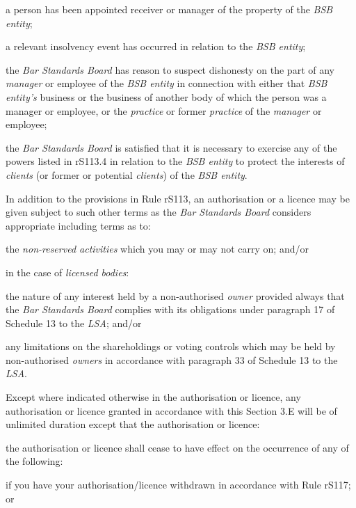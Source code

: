\item a person has been appointed receiver or manager of the property of
the \emph{BSB entity};

\item a relevant insolvency event has occurred in relation to the \emph{BSB
entity};

\item the \emph{Bar Standards Board} has reason to suspect dishonesty on
the part of any \emph{manager} or employee of the \emph{BSB entity} in
connection with either that \emph{BSB entity's} business or the business
of another body of which the person was a manager or employee, or the
\emph{practice} or former \emph{practice} of the \emph{manager} or
employee;

\item the \emph{Bar Standards Board} is satisfied that it is necessary to
exercise any of the powers listed in rS113.4 in relation to the
\emph{BSB entity} to protect the interests of \emph{clients} (or former
or potential \emph{clients}) of the \emph{BSB entity}.\la
\ln
{}

In addition to the provisions in Rule rS113, an authorisation or a
licence may be given subject to such other terms as the \emph{Bar
Standards Board} considers appropriate including terms as to:\nl\item the \emph{non-reserved activities} which you may or may not carry on;
and/or
\item in the case of \emph{licensed bodies}:
\al
\item the nature of any interest held by a non-authorised \emph{owner}
provided always that the \emph{Bar Standards Board} complies with its
obligations under paragraph 17 of Schedule 13 to the \emph{LSA}; and/or

\item any limitations on the shareholdings or voting controls which may be
held by non-authorised \emph{owners} in accordance with paragraph 33 of
Schedule 13 to the \emph{LSA}.\la
\ln
{}



Except where indicated otherwise in the authorisation or licence, any
authorisation or licence granted in accordance with this Section 3.E
will be of unlimited duration except that the authorisation or licence:\nl\item the authorisation or licence shall cease to have effect on the
occurrence of any of the following:
\al
\item if you have your authorisation/licence withdrawn in accordance with
Rule rS117; or

